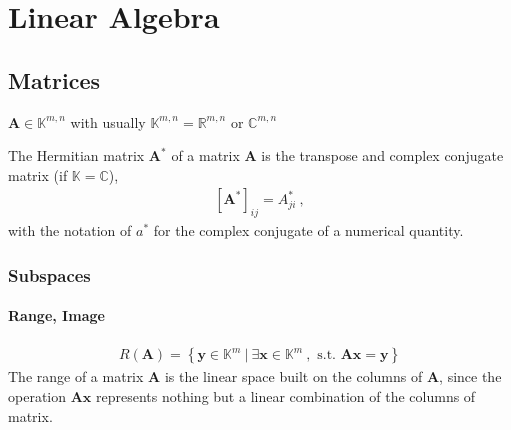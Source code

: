 \documentclass[letterpaper,10pt,english]{jupyterBook}
\begin{document}
\sphinxstepscope


\part{Linear Algebra}

\sphinxstepscope


\chapter{Matrices}
\label{\detokenize{ch/linear-algebra/matrices:matrices}}\label{\detokenize{ch/linear-algebra/matrices:math-linear-algebra-matrix}}\label{\detokenize{ch/linear-algebra/matrices::doc}}
\sphinxAtStartPar
\(\mathbf{A} \in \mathbb{K}^{m,n} \) with usually \(\mathbb{K}^{m,n} = \mathbb{R}^{m,n}\) or \(\mathbb{C}^{m,n}\)

\sphinxAtStartPar
{} The Hermitian matrix \(\mathbf{A}^*\) of a matrix \(\mathbf{A}\) is the transpose and complex conjugate matrix (if \(\mathbb{K} = \mathbb{C}\)),
\begin{equation*}
\begin{split}[\mathbf{A}^*]_{ij} = A^*_{ji} \ ,\end{split}
\end{equation*}
\sphinxAtStartPar
with the notation of \(a^*\) for the complex conjugate of a numerical quantity.


\section{Subspaces}
\label{\detokenize{ch/linear-algebra/matrices:subspaces}}\label{\detokenize{ch/linear-algebra/matrices:math-linear-algebra-matrix-subspaces}}

\subsection{Range, Image}
\label{\detokenize{ch/linear-algebra/matrices:range-image}}\label{\detokenize{ch/linear-algebra/matrices:math-linear-algebra-matrix-subspaces-range}}\begin{equation*}
\begin{split}R(\mathbf{A}) = \left\{ \mathbf{y} \in \mathbb{K}^m \ | \ \exists \mathbf{x} \in \mathbb{K}^m \ , \text{ s.t. } \mathbf{A} \mathbf{x} = \mathbf{y} \right\}\end{split}
\end{equation*}
\sphinxAtStartPar
The range of a matrix \(\mathbf{A}\) is the linear space built on the columns of \(\mathbf{A}\), since the operation \(\mathbf{A} \mathbf{x}\) represents nothing but a linear combination of the columns of matrix.
\end{document}
